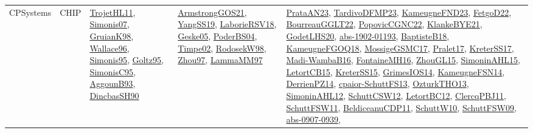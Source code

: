 {\begin{longtable}{lp{3cm}>{\raggedright}p{6cm}>{\raggedright}p{6cm}p{8cm}}
CPSystems & CHIP & \href{articles/TrojetHL11.pdf}{TrojetHL11}\cite{TrojetHL11}, \href{articles/Simonis07.pdf}{Simonis07}\cite{Simonis07}, \href{papers/GruianK98.pdf}{GruianK98}\cite{GruianK98}, \href{articles/Wallace96.pdf}{Wallace96}\cite{Wallace96}, \href{papers/Simonis95.pdf}{Simonis95}\cite{Simonis95}, \href{papers/Goltz95.pdf}{Goltz95}\cite{Goltz95}, \href{papers/SimonisC95.pdf}{SimonisC95}\cite{SimonisC95}, \href{articles/AggounB93.pdf}{AggounB93}\cite{AggounB93}, \href{articles/DincbasSH90.pdf}{DincbasSH90}\cite{DincbasSH90} & \href{papers/ArmstrongGOS21.pdf}{ArmstrongGOS21}\cite{ArmstrongGOS21}, \href{papers/YangSS19.pdf}{YangSS19}\cite{YangSS19}, \href{articles/LaborieRSV18.pdf}{LaborieRSV18}\cite{LaborieRSV18}, \href{papers/Geske05.pdf}{Geske05}\cite{Geske05}, \href{articles/PoderBS04.pdf}{PoderBS04}\cite{PoderBS04}, \href{articles/Timpe02.pdf}{Timpe02}\cite{Timpe02}, \href{papers/RodosekW98.pdf}{RodosekW98}\cite{RodosekW98}, \href{articles/Zhou97.pdf}{Zhou97}\cite{Zhou97}, \href{articles/LammaMM97.pdf}{LammaMM97}\cite{LammaMM97} & \href{articles/PrataAN23.pdf}{PrataAN23}\cite{PrataAN23}, \href{papers/TardivoDFMP23.pdf}{TardivoDFMP23}\cite{TardivoDFMP23}, \href{papers/KameugneFND23.pdf}{KameugneFND23}\cite{KameugneFND23}, \href{articles/FetgoD22.pdf}{FetgoD22}\cite{FetgoD22}, \href{articles/BourreauGGLT22.pdf}{BourreauGGLT22}\cite{BourreauGGLT22}, \href{papers/PopovicCGNC22.pdf}{PopovicCGNC22}\cite{PopovicCGNC22}, \href{papers/KlankeBYE21.pdf}{KlankeBYE21}\cite{KlankeBYE21}, \href{papers/GodetLHS20.pdf}{GodetLHS20}\cite{GodetLHS20}, \href{articles/abs-1902-01193.pdf}{abs-1902-01193}\cite{abs-1902-01193}, \href{articles/BaptisteB18.pdf}{BaptisteB18}\cite{BaptisteB18}, \href{papers/KameugneFGOQ18.pdf}{KameugneFGOQ18}\cite{KameugneFGOQ18}, \href{papers/MossigeGSMC17.pdf}{MossigeGSMC17}\cite{MossigeGSMC17}, \href{papers/Pralet17.pdf}{Pralet17}\cite{Pralet17}, \href{articles/KreterSS17.pdf}{KreterSS17}\cite{KreterSS17}, \href{papers/Madi-WambaB16.pdf}{Madi-WambaB16}\cite{Madi-WambaB16}, \href{papers/FontaineMH16.pdf}{FontaineMH16}\cite{FontaineMH16}, \href{papers/ZhouGL15.pdf}{ZhouGL15}\cite{ZhouGL15}, \href{articles/SimoninAHL15.pdf}{SimoninAHL15}\cite{SimoninAHL15}, \href{articles/LetortCB15.pdf}{LetortCB15}\cite{LetortCB15}, \href{papers/KreterSS15.pdf}{KreterSS15}\cite{KreterSS15}, \href{articles/GrimesIOS14.pdf}{GrimesIOS14}\cite{GrimesIOS14}, \href{articles/KameugneFSN14.pdf}{KameugneFSN14}\cite{KameugneFSN14}, \href{papers/DerrienPZ14.pdf}{DerrienPZ14}\cite{DerrienPZ14}, \href{papers/cpaior-SchuttFS13.pdf}{cpaior-SchuttFS13}\cite{cpaior-SchuttFS13}, \href{articles/OzturkTHO13.pdf}{OzturkTHO13}\cite{OzturkTHO13}, \href{papers/SimoninAHL12.pdf}{SimoninAHL12}\cite{SimoninAHL12}, \href{papers/SchuttCSW12.pdf}{SchuttCSW12}\cite{SchuttCSW12}, \href{papers/LetortBC12.pdf}{LetortBC12}\cite{LetortBC12}, \href{papers/ClercqPBJ11.pdf}{ClercqPBJ11}\cite{ClercqPBJ11}, \href{articles/SchuttFSW11.pdf}{SchuttFSW11}\cite{SchuttFSW11}, \href{articles/BeldiceanuCDP11.pdf}{BeldiceanuCDP11}\cite{BeldiceanuCDP11}, \href{papers/SchuttW10.pdf}{SchuttW10}\cite{SchuttW10}, \href{papers/SchuttFSW09.pdf}{SchuttFSW09}\cite{SchuttFSW09}, \href{articles/abs-0907-0939.pdf}{abs-0907-0939}\cite{abs-0907-0939}, 
\end{longtable}}
